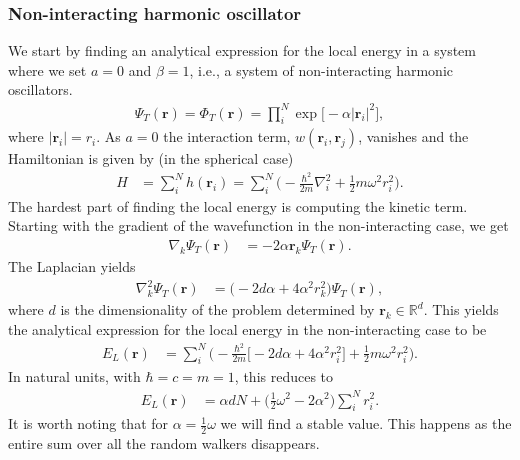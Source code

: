 \documentclass[
    a4paper, aps, twocolumn, floatfix, superscriptaddress, nofootinbib]{revtex4-1}
\newcommand{\vf}{\mathbf}
\newcommand{\1}{\mathds{1}}
\newcommand{\half}{\frac{1}{2}}
\begin{document}
        \subsubsection{Non-interacting harmonic oscillator}
            We start by finding an analytical expression for the local energy in
            a system where we set $a = 0$ and $\beta = 1$, i.e., a system of
            non-interacting harmonic oscillators.
            \begin{align}
                \Psi_T(\vf{r})
                = \Phi_T(\vf{r})
                = \prod_i^N \exp\bigl[
                    -\alpha |\vf{r}_i|^2
                \bigr],
            \end{align}
            where $|\vf{r}_i| = r_i$. As $a = 0$ the interaction term,
            $w(\vf{r}_i, \vf{r}_j)$, vanishes and the Hamiltonian is given by
            (in the spherical case)
            \begin{align}
                H &= \sum_i^N h(\vf{r}_i)
                = \sum_i^N \Biggl(
                    -\frac{\hbar^2}{2m}\nabla_i^2
                    + \half m \omega^2 r_i^2
                \Biggr).
            \end{align}
            The hardest part of finding the local energy is computing the
            kinetic term. Starting with the gradient of the wavefunction in the
            non-interacting case, we get
            \begin{align}
                \nabla_k\Psi_T(\vf{r})
                &= -2\alpha \vf{r}_k\Psi_T(\vf{r}).
            \end{align}
            The Laplacian yields
            \begin{align}
                \nabla^2_k\Psi_T(\vf{r})
                &= \big(-2d\alpha + 4\alpha^2 r_k^2\bigr)\Psi_T(\vf{r}),
            \end{align}
            where $d$ is the dimensionality of the problem determined by
            $\vf{r}_k \in \mathbb{R}^d$. This yields the analytical expression
            for the local energy in the non-interacting case to be
            \begin{align}
                E_L(\vf{r})
                &=
                \sum_i^N
                \Biggl(
                    -\frac{\hbar^2}{2m}
                    \bigl[
                        -2d\alpha + 4\alpha^2 r_i^2
                    \bigr]
                    + \half m\omega^2 r_i^2
                \Biggr).
            \end{align}
            In natural units, with $\hbar = c = m = 1$, this reduces to
            \begin{align}
                E_L(\vf{r})
                &=
                \alpha dN
                + \biggl(
                    \half\omega^2
                    - 2\alpha^2
                \biggr)
                \sum_i^N r_i^2.
            \end{align}
            It is worth noting that for $\alpha = \half\omega$ we will find a
            stable value. This happens as the entire sum over all the random
            walkers disappears.
\end{document}

